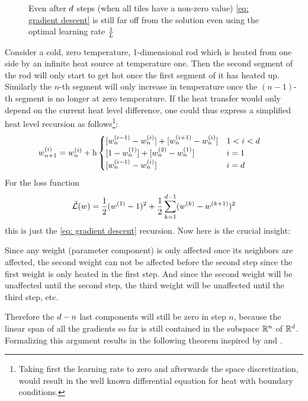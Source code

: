 \begin{figure}[h]
	\centering
	\def\svgwidth{1\textwidth}
	
	\caption{Even after \(d\) steps (when all tiles have a non-zero value)
	\ref{eq: gradient descent} is still far off from the solution even using the optimal
	learning rate \(\tfrac1{L}\)}
	\label{fig: visualize coloring problem}
\end{figure}
%
Consider a cold, zero temperature, 1-dimensional rod which is heated from one side
by an infinite heat source at temperature one. Then the second segment of the rod
will only start to get hot once the first segment of it has heated up. Similarly
the \(n\)-th segment will only increase in temperature once the \((n-1)\)-th segment
is no longer at zero temperature. If the heat transfer would only depend on the
current heat level difference, one could thus express a simplified heat level
recursion as follows\footnote{
	Taking first the learning rate to zero and afterwards the space discretization, would
	result in the well known differential equation for heat with boundary
	conditions.
}: 
%
\begin{align*}
	\weights_{n+1}^{(i)}
	&= \weights_{n}^{(i)}
	+ \lr 
	\begin{cases}
		[\weights_{n}^{(i-1)} - \weights_{n}^{(i)}] + [\weights_{n}^{(i+1)} - \weights_{n}^{(i)}]
		&  1 < i < \dimension \\
		[1 - \weights_{n}^{(1)}] + [\weights_{n}^{(2)} - \weights_{n}^{(1)}]
		& i = 1 \\
		[\weights_{n}^{(i-1)} - \weights_{n}^{(i)}]
		& i = \dimension
	\end{cases}
\end{align*}
%
For the loss function
%
\begin{align}\label{eq: naive complexity counterexample loss}
	\tilde{\mathcal{L}}(w)
	= \frac12 (w^{(1)}-1)^2
	+ \frac12 \sum_{k=1}^{d-1} (w^{(k)}-w^{(k+1)})^2
\end{align}
%
this is just the \ref{eq: gradient descent} recursion. Now here is the crucial insight:

Since any weight (parameter component) is only affected once its neighbors are
affected, the second weight can not be affected before the second step since
the first weight is only heated in the first step. And since the second weight
will be unaffected until the second step, the third weight will be unaffected
until the third step, etc.

Therefore the \(d - n\) last components will still be zero in
step \(n\), because the linear span of all the gradients so far is still
contained in the subspace \(\mathbb{R}^n\) of \(\mathbb{R}^d\). Formalizing
this argument results in the following theorem inspired by \textcite[Theorem
2.1.7]{nesterovLecturesConvexOptimization2018} and \textcite{gohWhyMomentumReally2017}.

